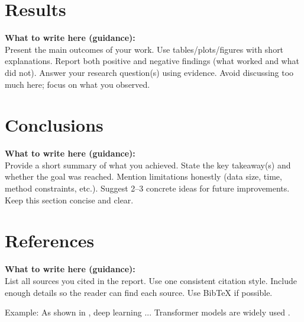 \documentclass[11pt,a4paper]{article}
\newcommand{\expectation}[1]{%
\colorbox{boxGray}{%
\parbox{\dimexpr\linewidth-2\fboxsep\relax}{%
\textbf{What to write here (guidance):}\\[-0.2em]
\textcolor{textGray}{#1}
}}}
\begin{document}
\section{Results}
\expectation{
Present the main outcomes of your work.
Use tables/plots/figures with short explanations.
Report both positive and negative findings (what worked and what did not).
Answer your research question(s) using evidence.
Avoid discussing too much here; focus on what you observed.
}

\vspace{0.5em}

\section{Conclusions}
\expectation{
Provide a short summary of what you achieved.
State the key takeaway(s) and whether the goal was reached.
Mention limitations honestly (data size, time, method constraints, etc.).
Suggest 2--3 concrete ideas for future improvements.
Keep this section concise and clear.
}

\vspace{0.5em}

\section{References}
\expectation{
List all sources you cited in the report.
Use one consistent citation style.
Include enough details so the reader can find each source.
Use BibTeX if possible.}

Example: As shown in \citet{lecun2015deep}, deep learning ... Transformer models are widely used \citep{vaswani2017attention}.



% 
% 




\end{document}
